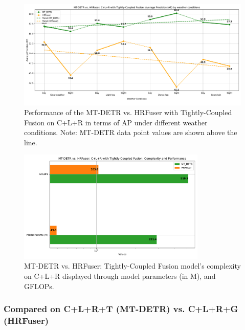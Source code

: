 \documentclass[report.tex]{subfiles}
\begin{document}
    \begin{figure}[h!]
        \centering
        \includegraphics[width=1.0\textwidth]{images/results/hrfuser_vs_mtdetr/clr/ap.pdf}
        \caption{Performance of the MT-DETR vs. HRFuser with Tightly-Coupled Fusion on C+L+R in terms of AP under different weather conditions. Note: MT-DETR data point values are shown above the line.}
        \label{fig:hrfuser_vs_mtdetr_clr_ap}
    \end{figure}

    \begin{figure}[h!]
        \centering
        \includegraphics[width=0.8\textwidth]{images/results/hrfuser_vs_mtdetr/clr/model_complexity.pdf}
        \caption{MT-DETR vs. HRFuser: Tightly-Coupled Fusion model's complexity on C+L+R displayed through model parameters (in M), and GFLOPs.}
        \label{fig:hrfuser_vs_mtdetr_clr_model_complexity}
    \end{figure}
    \FloatBarrier
    \subsubsection{Compared on C+L+R+T (MT-DETR) vs. C+L+R+G (HRFuser)}
\end{document}
